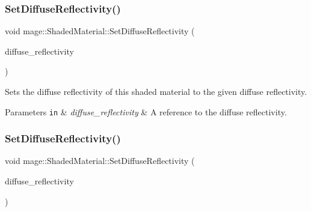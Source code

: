 \hypertarget{structmage_1_1_shaded_material_a2da4b314ab2f92659cbed167cc1f32c9}{}\label{structmage_1_1_shaded_material_a2da4b314ab2f92659cbed167cc1f32c9} 
\subsubsection{\texorpdfstring{Set\+Diffuse\+Reflectivity()}{SetDiffuseReflectivity()}\hspace{0.1cm}{\footnotesize\ttfamily [1/2]}}
{\footnotesize\ttfamily void mage\+::\+Shaded\+Material\+::\+Set\+Diffuse\+Reflectivity (\begin{DoxyParamCaption}\item[{const \hyperlink{structmage_1_1_r_g_b_spectrum}{R\+G\+B\+Spectrum} \&}]{diffuse\+\_\+reflectivity }\end{DoxyParamCaption})\hspace{0.3cm}{\ttfamily [noexcept]}}

Sets the diffuse reflectivity of this shaded material to the given diffuse reflectivity.


\begin{DoxyParams}[1]{Parameters}
\mbox{\tt in}  & {\em diffuse\+\_\+reflectivity} & A reference to the diffuse reflectivity. \\
\hline
\end{DoxyParams}
\hypertarget{structmage_1_1_shaded_material_a672e0afafbad1280c97d2ad909b320c8}{}\label{structmage_1_1_shaded_material_a672e0afafbad1280c97d2ad909b320c8} 
\subsubsection{\texorpdfstring{Set\+Diffuse\+Reflectivity()}{SetDiffuseReflectivity()}\hspace{0.1cm}{\footnotesize\ttfamily [2/2]}}
{\footnotesize\ttfamily void mage\+::\+Shaded\+Material\+::\+Set\+Diffuse\+Reflectivity (\begin{DoxyParamCaption}\item[{\hyperlink{structmage_1_1_r_g_b_spectrum}{R\+G\+B\+Spectrum} \&\&}]{diffuse\+\_\+reflectivity }\end{DoxyParamCaption})\hspace{0.3cm}{\ttfamily [noexcept]}}

